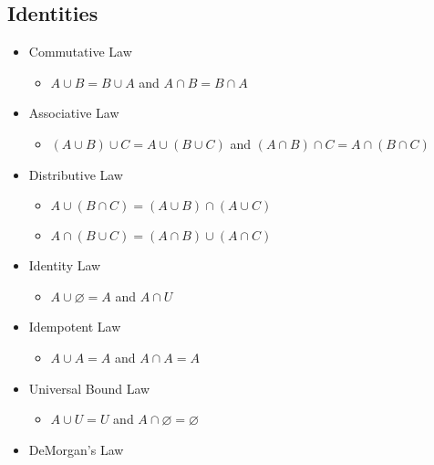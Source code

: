 \documentclass[landscape, letterpaper, 8pt]{extarticle}
\begin{document}
\begin{multicols}{2}
    \subsection*{Identities}
    \begin{itemize}[noitemsep,nolistsep]
        \item Commutative Law
              \begin{itemize}[noitemsep,nolistsep]
                  \item $A \cup B = B \cup A $ and $A \cap B = B \cap A$
              \end{itemize}
        \item Associative Law
              \begin{itemize}[noitemsep,nolistsep]
                  \item $(A \cup B) \cup C = A \cup (B \cup C)$ and $(A \cap B) \cap C = A \cap (B \cap C)$
              \end{itemize}
        \item Distributive Law
              \begin{itemize}[noitemsep,nolistsep]
                  \item $A \cup (B \cap C) = (A \cup B) \cap (A \cup C)$
                  \item $A \cap (B \cup C) = (A \cap B) \cup (A \cap C)$
              \end{itemize}
        \item Identity Law
              \begin{itemize}[noitemsep,nolistsep]
                  \item $A \cup \varnothing = A$ and $A \cap U$
              \end{itemize}
        \item Idempotent Law
              \begin{itemize}[noitemsep,nolistsep]
                  \item $A \cup A = A$ and $A\cap A = A$
              \end{itemize}
        \item Universal Bound Law
              \begin{itemize}[noitemsep,nolistsep]
                  \item $A \cup U = U$ and $A  \cap \varnothing = \varnothing$
              \end{itemize}
        \item DeMorgan's Law
              \begin{itemize}

\end{itemize}
\end{itemize}
\end{multicols}
\end{document}
